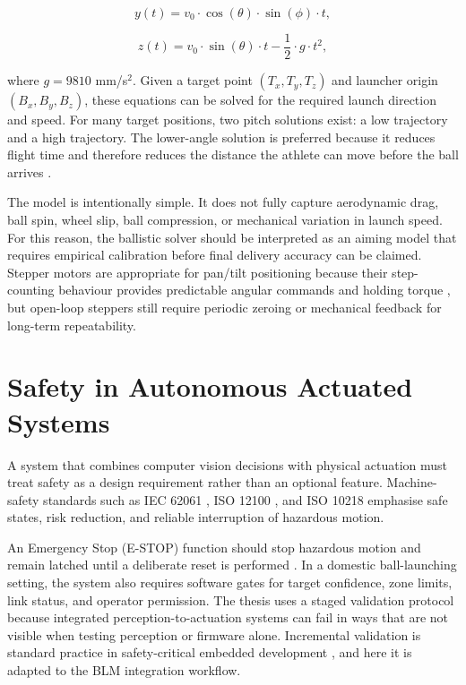 \begin{equation}
y(t) = v_0 \cdot \cos(\theta) \cdot \sin(\phi) \cdot t ,
\label{eq:2_3}
\end{equation}

\begin{equation}
z(t) = v_0 \cdot \sin(\theta) \cdot t - \frac{1}{2} \cdot g \cdot t^2 ,
\label{eq:2_4}
\end{equation}

where $g = 9810$ mm/s$^2$. Given a target point $(T_x, T_y, T_z)$ and launcher origin $(B_x, B_y, B_z)$, these equations can be solved for the required launch direction and speed. For many target positions, two pitch solutions exist: a low trajectory and a high trajectory. The lower-angle solution is preferred because it reduces flight time and therefore reduces the distance the athlete can move before the ball arrives \cite{ref19}.

The model is intentionally simple. It does not fully capture aerodynamic drag, ball spin, wheel slip, ball compression, or mechanical variation in launch speed. For this reason, the ballistic solver should be interpreted as an aiming model that requires empirical calibration before final delivery accuracy can be claimed. Stepper motors are appropriate for pan/tilt positioning because their step-counting behaviour provides predictable angular commands and holding torque \cite{ref20}, but open-loop steppers still require periodic zeroing or mechanical feedback for long-term repeatability.

\section{Safety in Autonomous Actuated Systems}

A system that combines computer vision decisions with physical actuation must treat safety as a design requirement rather than an optional feature. Machine-safety standards such as IEC 62061 \cite{ref21}, ISO 12100 \cite{ref22}, and ISO 10218 \cite{ref26} emphasise safe states, risk reduction, and reliable interruption of hazardous motion.

An Emergency Stop (E-STOP) function should stop hazardous motion and remain latched until a deliberate reset is performed \cite{ref22}. In a domestic ball-launching setting, the system also requires software gates for target confidence, zone limits, link status, and operator permission. The thesis uses a staged validation protocol because integrated perception-to-actuation systems can fail in ways that are not visible when testing perception or firmware alone. Incremental validation is standard practice in safety-critical embedded development \cite{ref23}, and here it is adapted to the BLM integration workflow.

